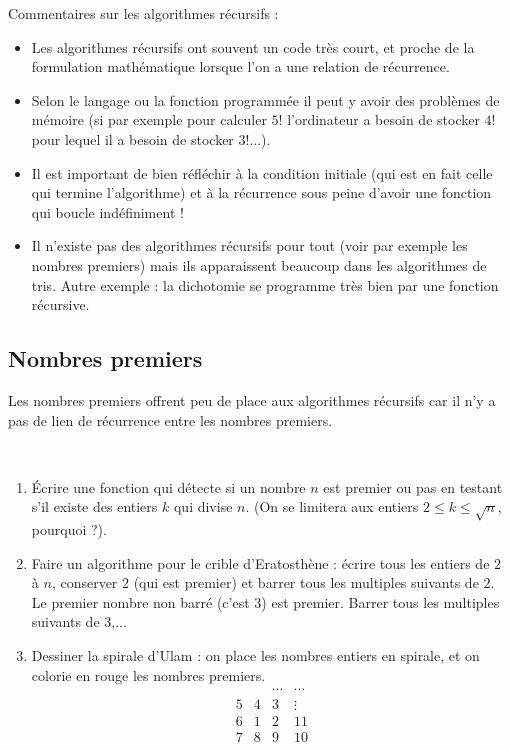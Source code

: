 \documentclass[class=report,crop=false]{standalone}
\begin{document}
\bigskip

Commentaires sur les algorithmes récursifs :
\begin{itemize}
  \item Les algorithmes récursifs ont souvent un code très court,
  et proche de la formulation mathématique lorsque l'on a une relation de récurrence.

  \item Selon le langage ou la fonction programmée il peut y avoir des problèmes de mémoire
  (si par exemple pour calculer $5!$ l'ordinateur a besoin de stocker $4!$ pour lequel il a besoin de stocker $3!$...).

  \item Il est important de bien réfléchir à la condition initiale (qui est en fait celle qui termine l'algorithme)
  et à la récurrence sous peine d'avoir une fonction qui boucle indéfiniment !

  \item Il n'existe pas des algorithmes récursifs pour tout (voir par exemple les nombres premiers) mais ils apparaissent
  beaucoup dans les algorithmes de tris. Autre exemple : la dichotomie se programme très bien par une fonction récursive.
\end{itemize}

\subsection{Nombres premiers}

Les nombres premiers offrent peu de place aux algorithmes récursifs
car il n'y a pas de lien de récurrence entre les nombres premiers.

\begin{tp}~
\begin{enumerate}
  \item \'Ecrire une fonction qui détecte si un nombre $n$ est premier ou pas en testant s'il existe des entiers
  $k$ qui divise $n$. (On se limitera aux entiers $2 \le k \le \sqrt{n}$, pourquoi ?).
  \item Faire un algorithme pour le crible d'Eratosthène : écrire tous les entiers de $2$ à $n$,
  conserver $2$ (qui est premier) et barrer tous les multiples suivants de $2$. Le premier nombre non barré (c'est $3$) est premier.
  Barrer tous les multiples suivants de $3$,...
  \item Dessiner la spirale d'Ulam : on place les nombres entiers en spirale, et on colorie en rouge les nombres premiers.
  $$\begin{matrix} & & \cdots & \cdots \\ 5 & 4 & 3 & \vdots \\ 6 & 1 & 2 & 11 \\ 7 & 8 & 9 & 10 \\\end{matrix}$$
\end{enumerate}
\end{tp}
\end{document}

